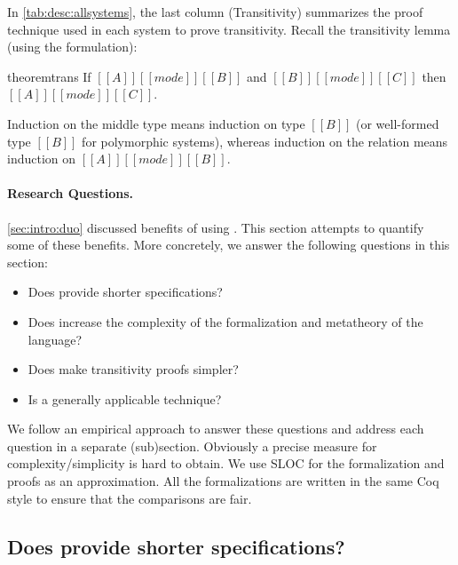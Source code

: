 In \cref{tab:desc:allsystems}, the last column (Transitivity) summarizes the
proof technique used in each system to prove transitivity.
Recall the transitivity lemma (using the \nameduo formulation):

\begin{restatable}[Transitivity]{theorem}{trans}
  If $[[A]] [[mode]] [[B]]$ and $[[B]] [[mode]] [[C]]$ then $[[A]] [[mode]] [[C]]$.
\end{restatable}

\noindent Induction on the middle type means induction on type $[[B]]$ (or well-formed type $[[B]]$ for polymorphic systems),
whereas induction on the \nameduo relation means induction on $[[A]] [[mode]] [[B]]$.

\paragraph{Research Questions.}
\cref{sec:intro:duo} discussed benefits of using \nameduo.
This section attempts to quantify some of these benefits. More concretely,
we answer the following questions in this section:
\begin{itemize}
  \item{Does \nameduo provide shorter specifications?}
  \item{Does \nameduo increase the complexity of the formalization and metatheory of the language?}
  \item{Does \nameduo make transitivity proofs simpler?}
        \item{Is \nameduo a generally applicable technique?}
\end{itemize}

\noindent We follow an empirical approach to answer these questions and address each question in a separate (sub)section.
Obviously a precise measure for complexity/simplicity is hard to obtain.
We use SLOC for the formalization and proofs as an approximation.
All the formalizations are written in the same Coq style to ensure
that the comparisons are fair.
 

\subsection{Does \nameduo provide shorter specifications?}

